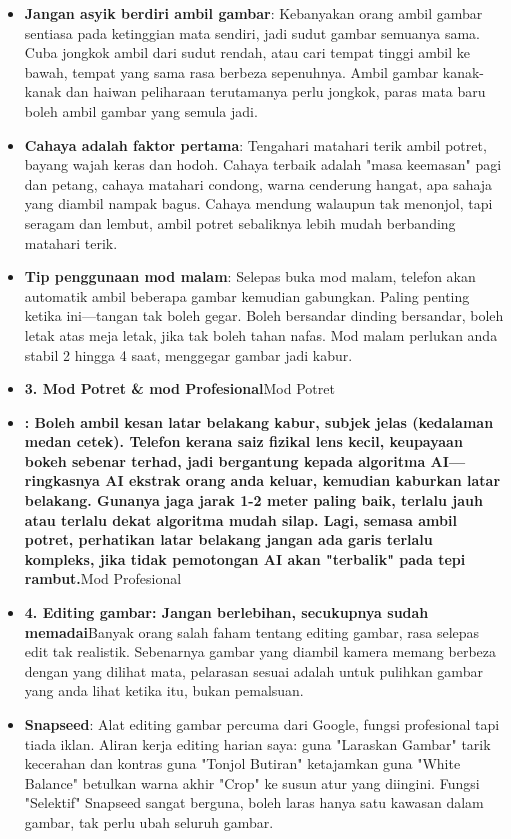 \begin{itemize}
  \item \textbf{Jangan asyik berdiri ambil gambar}: Kebanyakan orang ambil gambar sentiasa pada ketinggian mata sendiri, jadi sudut gambar semuanya sama. Cuba jongkok ambil dari sudut rendah, atau cari tempat tinggi ambil ke bawah, tempat yang sama rasa berbeza sepenuhnya. Ambil gambar kanak-kanak dan haiwan peliharaan terutamanya perlu jongkok, paras mata baru boleh ambil gambar yang semula jadi.
  \item \textbf{Cahaya adalah faktor pertama}: Tengahari matahari terik ambil potret, bayang wajah keras dan hodoh. Cahaya terbaik adalah "masa keemasan" pagi dan petang, cahaya matahari condong, warna cenderung hangat, apa sahaja yang diambil nampak bagus. Cahaya mendung walaupun tak menonjol, tapi seragam dan lembut, ambil potret sebaliknya lebih mudah berbanding matahari terik.
  \item \textbf{Tip penggunaan mod malam}: Selepas buka mod malam, telefon akan automatik ambil beberapa gambar kemudian gabungkan. Paling penting ketika ini—tangan tak boleh gegar. Boleh bersandar dinding bersandar, boleh letak atas meja letak, jika tak boleh tahan nafas. Mod malam perlukan anda stabil 2 hingga 4 saat, menggegar gambar jadi kabur.
  \item \textbf{3. Mod Potret \& mod Profesional}Mod Potret
  \item \textbf{: Boleh ambil kesan latar belakang kabur, subjek jelas (kedalaman medan cetek). Telefon kerana saiz fizikal lens kecil, keupayaan bokeh sebenar terhad, jadi bergantung kepada algoritma AI—ringkasnya AI ekstrak orang anda keluar, kemudian kaburkan latar belakang. Gunanya jaga jarak 1-2 meter paling baik, terlalu jauh atau terlalu dekat algoritma mudah silap. Lagi, semasa ambil potret, perhatikan latar belakang jangan ada garis terlalu kompleks, jika tidak pemotongan AI akan "terbalik" pada tepi rambut.}Mod Profesional
\end{itemize}


\begin{itemize}
  \item \textbf{4. Editing gambar: Jangan berlebihan, secukupnya sudah memadai}Banyak orang salah faham tentang editing gambar, rasa selepas edit tak realistik. Sebenarnya gambar yang diambil kamera memang berbeza dengan yang dilihat mata, pelarasan sesuai adalah untuk pulihkan gambar yang anda lihat ketika itu, bukan pemalsuan.
  \item \textbf{Snapseed}: Alat editing gambar percuma dari Google, fungsi profesional tapi tiada iklan. Aliran kerja editing harian saya: guna "Laraskan Gambar" tarik kecerahan dan kontras guna "Tonjol Butiran" ketajamkan guna "White Balance" betulkan warna akhir "Crop" ke susun atur yang diingini. Fungsi "Selektif" Snapseed sangat berguna, boleh laras hanya satu kawasan dalam gambar, tak perlu ubah seluruh gambar.
\end{itemize}


